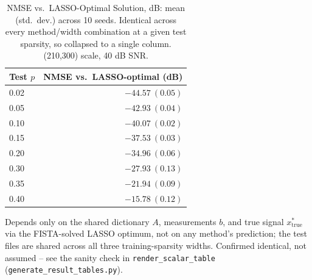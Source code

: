 \begin{table}[htbp]
\centering
\caption{NMSE vs.\ LASSO-Optimal Solution, dB: mean (std.\ dev.) across 10 seeds. Identical across every method/width combination at a given test sparsity, so collapsed to a single column. (210,300) scale, 40 dB SNR.}
\label{tab:exp2-nmse-lassoopt}
\begin{tabular}{@{} l r @{}}
\toprule
Test $p$ & NMSE vs.\ LASSO-optimal (dB) \\
\midrule
0.02 & $-44.57\ (0.05)$ \\
0.05 & $-42.93\ (0.04)$ \\
0.10 & $-40.07\ (0.02)$ \\
0.15 & $-37.53\ (0.03)$ \\
0.20 & $-34.96\ (0.06)$ \\
0.30 & $-27.93\ (0.13)$ \\
0.35 & $-21.94\ (0.09)$ \\
0.40 & $-15.78\ (0.12)$ \\
\bottomrule
\end{tabular}
\vspace{2pt}
\begin{minipage}{\linewidth}\footnotesize
Depends only on the shared dictionary $A$, measurements $b$, and true signal $x^*_{\text{true}}$ via the FISTA-solved LASSO optimum, not on any method's prediction; the test files are shared across all three training-sparsity widths. Confirmed identical, not assumed -- see the sanity check in \texttt{render\_scalar\_table} (\texttt{generate\_result\_tables.py}).
\end{minipage}
\end{table}
